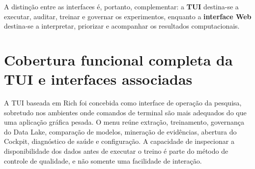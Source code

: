 A distinção entre as interfaces é, portanto, complementar: a \textbf{TUI} destina-se a executar, auditar, treinar e governar os experimentos, enquanto a \textbf{interface Web} destina-se a interpretar, priorizar e acompanhar os resultados computacionais.

\section{Cobertura funcional completa da TUI e interfaces associadas}\label{cobertura-funcional-completa-da-tui-e-interfaces-associadas}

A TUI baseada em Rich foi concebida como interface de operação da pesquisa, sobretudo nos ambientes onde comandos de terminal são mais adequados do que uma aplicação gráfica pesada. O menu reúne extração, treinamento, governança do Data Lake, comparação de modelos, mineração de evidências, abertura do Cockpit, diagnóstico de saúde e configuração. A capacidade de inspecionar a disponibilidade dos dados antes de executar o treino é parte do método de controle de qualidade, e não somente uma facilidade de interação.


